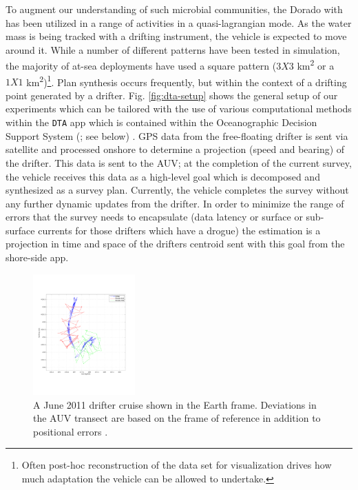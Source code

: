 To augment our understanding of such microbial communities, the Dorado
with \rx has been utilized in a range of activities in a
quasi-lagrangian mode. As the water mass is being tracked with a
drifting instrument, the vehicle is expected to move around it. While
a number of different patterns have been tested in simulation, the
majority of at-sea deployments have used a square pattern ($3X3$
km\textsuperscript{2} or a $1X1$ km\textsuperscript{2})\footnote{Often
  post-hoc reconstruction of the data set for visualization drives how
  much adaptation the vehicle can be allowed to undertake.}. Plan
synthesis occurs frequently, but within the context of a drifting
point generated by a drifter. Fig. \ref{fig:dta-setup} shows the
general setup of our experiments which can be tailored with the use of
various computational methods within the \texttt{DTA} app which is
contained within the Oceanographic Decision Support System (\od; see
below) \cite{das11}. GPS data from the free-floating drifter is sent
via satellite and processed onshore to determine a projection (speed
and bearing) of the drifter. This data is sent to the AUV; at the
completion of the current survey, the vehicle receives this data as a
high-level goal which is decomposed and synthesized as a survey
plan. Currently, the vehicle completes the survey without any further
dynamic updates from the drifter. In order to minimize the range of
errors that the survey needs to encapsulate (data latency or surface
or sub-surface currents for those drifters which have a drogue) the
estimation is a projection in time and space of the drifters centroid
sent with this goal from the shore-side app.

\begin{figure}[htpb]
\centering
\includegraphics[width=0.35\textwidth]{figs/june11-drifter-follow-180-181.pdf}
\caption{\small{A June 2011 drifter cruise shown in the Earth
    frame. Deviations in the AUV transect are based on the frame of
    reference in addition to positional errors \cite{das11b}.}}
\label{fig:drifter-errors}
\end{figure}

